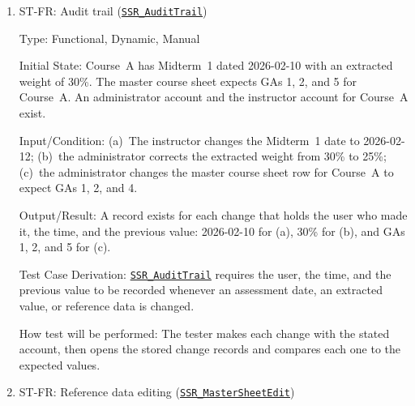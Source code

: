 \documentclass[12pt, titlepage]{article}
\newcounter{stnum}
\newcommand{\halink}[1]{\href{https://github.com/shivyam/cas-course-optimization/blob/main/pdfs/HazardAnalysis/HazardAnalysis.pdf}{#1}}
\begin{document}
\begin{enumerate}
Input/Condition: Before the instructor of Course~A decides, the instructor of Course~D changes that assessment to 2026-03-05.

Output/Result: The pending suggestions for Midterm~1 are marked as out of date, and the instructor of Course~A can request new suggestions.

Test Case Derivation: \halink{\texttt{SSR\_StaleSuggestion}} requires a suggestion to be marked out of date if the other assessments in the affected weeks change before the instructor decides on it.

How test will be performed: The tester requests suggestions as the instructor of Course~A, changes the Course~D date as its instructor, and returns to the pending suggestions as the instructor of Course~A.


\item{ST-FR\thestnum \label{ST_AuditTrail}: Audit trail (\halink{\texttt{SSR\_AuditTrail}})\\}

Type: Functional, Dynamic, Manual

Initial State: Course~A has Midterm~1 dated 2026-02-10 with an extracted weight of 30\%. The master course sheet expects GAs 1, 2, and 5 for Course~A. An administrator account and the instructor account for Course~A exist.

Input/Condition: (a)~The instructor changes the Midterm~1 date to 2026-02-12; (b)~the administrator corrects the extracted weight from 30\% to 25\%; (c)~the administrator changes the master course sheet row for Course~A to expect GAs 1, 2, and 4.

Output/Result: A record exists for each change that holds the user who made it, the time, and the previous value: 2026-02-10 for (a), 30\% for (b), and GAs 1, 2, and 5 for (c).

Test Case Derivation: \halink{\texttt{SSR\_AuditTrail}} requires the user, the time, and the previous value to be recorded whenever an assessment date, an extracted value, or reference data is changed.

How test will be performed: The tester makes each change with the stated account, then opens the stored change records and compares each one to the expected values.


\item{ST-FR\thestnum \label{ST_MasterSheetEdit}: Reference data editing (\halink{\texttt{SSR\_MasterSheetEdit}})\\}


\end{enumerate}
\end{document}
